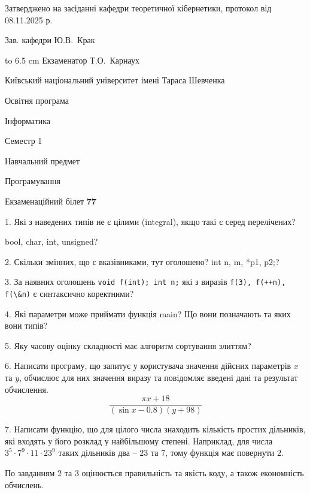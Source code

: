 \documentclass[12pt, ukrainian]{article}
\def\code#1{\Verb!#1!}
\begin{document}
{\smallskip\smallskip \begin {scriptsize} Затверджено на засіданні кафедри теоретичної кібернетики, протокол   від   08.11.2025 р.\par\smallskip\smallskip\smallskip\smallskip
{\parbox {6.5 cm} {Зав. кафедри \dotfill Ю.В.~Крак}}\hspace {0.7cm} {\hbox to 6.5 cm { Екзаменатор \dotfill Т.О.~Карнаух}} \end{scriptsize}}
\newpage
{{\begin {scriptsize}\par
{ \center  Київський національний університет імені Тараса Шевченка \par}
{\parbox {5 cm}{Освітня програма \hfill}{\parbox {7 cm}{Інформатика\hfill}}\parbox {6 cm}{\hfill Семестр 1}}\par
{\parbox {5 cm} {Навчальний предмет \hfill}\parbox {7 cm}{Програмування \hfill}\parbox {6cm}{\hfill}\par}\vspace{-15pt} \end{scriptsize}}{\center Екзаменаційний білет \No \textbf { 77 }\par}}
{%
1. Які з наведених типів не є цілими (integral), якщо такі є серед перелічених?

bool, char, int, unsigned?
\par
\vspace{2mm}
2. Скільки змінних, що є вказівниками, тут оголошено?
int n, m, *p1, p2;?
\par
\vspace{2mm}
3. За наявних оголошень \code{void f(int); int n;} які з виразів \code{f(3), f(++n), f(\&n)} є синтаксично коректними?
\par
\vspace{2mm}
4. Які параметри може приймати функція main? Що вони позначають та яких вони типів?
\par
\vspace{2mm}
5. Яку часову оцінку складності має алгоритм сортування злиттям?
\par
\vspace{2mm}
6. Написати програму, що запитує у користувача значення дійсних параметрів $x$ та $y$, обчислює для них значення виразу та повiдомляє введенi данi та результат обчислення.
$$\frac{\pi x + 18}{(\sin x - 0.8) (y + 98)}$$ 

\par
7. Написати функцію, що для цілого числа знаходить кількість простих дільників, які входять у його розклад у найбільшому степені. Наприклад, для числа $3^5{\cdot}7^9{\cdot}11{\cdot}23^{9}$ таких дільників два – $23$ та $7$, тому функція має повернути $2$.

По завданням 2 та 3 оцінюється правильність та якість коду, а також економність обчислень.

}
\end{document}
